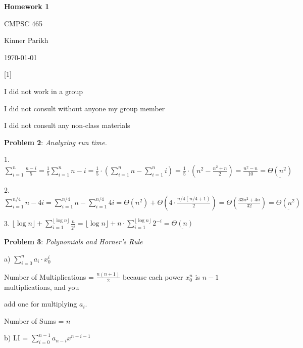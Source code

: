 \documentclass{article} %
\newcommand{\question}[2][]{\begin{flushleft}
        \textbf{Problem #1}: \textit{#2}

\end{flushleft}}
\newcommand{\maketitletwo}[2][]{\begin{center}
        \Large{\textbf{Homework #1}
            
            CMPSC 465} %
        \vspace{5pt}
        
        \normalsize{Kinner Parikh  %
        
        \today}        %
        \vspace{40pt}


        \newpage
        
\end{center}}
\begin{document}
    \maketitletwo[1]  %

    \question[1]{}
    \begin{center}
        
        I did not work in a group
    
        I did not consult without anyone my group member
    
        I did not consult any non-class materials
    \end{center}
    
    \newpage

    \question[2]{Analyzing run time.}

    1. $\sum^{n}_{i = 1} \frac{n-i}{5} = \frac{1}{5}\sum^{n}_{i = 1} n - i = \frac{1}{5} \cdot (\sum^{n}_{i = 1} n  - \sum^{n}_{i = 1} i) = \frac{1}{5} \cdot (n^2 - \frac{n^2 + n}{2}) = \frac{n^2 - n}{10} = \underline{\Theta(n^2)}$

    \vspace*{10 pt}

    2. $\sum^{n/4}_{i = 1} n - 4i = \sum^{n/4}_{i = 1} n - \sum^{n/4}_{i = 1} 4i = \Theta(n^2) + \Theta(4 \cdot \frac{n/4 (n/4 + 1)}{2}) = \Theta(\frac{33n^2 + 4n}{32}) = \underline{\Theta(n^2)}$

    \vspace*{10pt}

    3. $\lfloor \log n \rfloor + \sum^{\lfloor \log n \rfloor}_{i = 1} \frac{n}{2^i} = \lfloor \log n \rfloor + n \cdot \sum^{\lfloor \log n \rfloor}_{i = 1} 2^{-i} = \underline{\Theta(n)}$

    \newpage

    \question[3]{Polynomials and Horner's Rule}

    a) $\sum^{n}_{i = 0} a_i \cdot x_0^i$
    
    \hspace{12pt}Number of Multiplications = $\frac{n(n + 1)}{2}$ because each power $x^n_0$ is $n - 1$ multiplications, and you 
    
    \hspace{12pt}add one for multiplying $a_i$.
    
    \hspace{12pt}Number of Sums = $n$

    \vspace{5pt}

    b) LI = $\sum^{n - 1}_{i = 0} a_{n - i}x^{n - i - 1}$

    \vspace{5pt}
\end{document}
